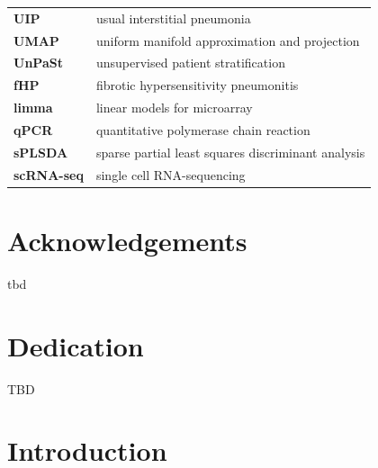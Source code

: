 \documentclass[
]{article}
\begin{document}
\begin{singlespace}
\begin{longtable}{>{}ll}
\textbf{UIP} & usual interstitial pneumonia\\
\textbf{UMAP} & uniform manifold approximation and projection\\
\textbf{UnPaSt} & unsupervised patient stratification\\
\textbf{fHP} & fibrotic hypersensitivity pneumonitis\\
\addlinespace
\textbf{limma} & linear models for microarray\\
\textbf{qPCR} & quantitative polymerase chain reaction\\
\textbf{sPLSDA} & sparse partial least squares discriminant analysis\\
\textbf{scRNA-seq} & single cell RNA-sequencing\\

\end{longtable}

\end{singlespace}

\clearpage

\section*{Acknowledgements}

tbd

\clearpage

\section*{Dedication}

\begin{center}
    \vspace*{\fill}
    TBD
    \vspace*{\fill}
\end{center}

\clearpage

\section{Introduction}\label{introduction}


\renewcommand{\thefigure}{1.\arabic{figure}}
\setcounter{figure}{0}
\renewcommand{\thetable}{1.\arabic{table}}
\setcounter{table}{0}
\renewcommand{\theequation}{1.\arabic{equation}}
\setcounter{equation}{0}
\end{document}

